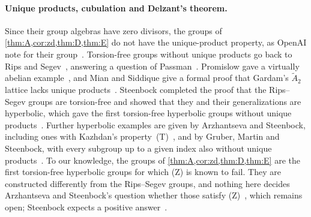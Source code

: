 \documentclass[11pt]{article}
\theoremstyle{definition}
\theoremstyle{plain}
\begin{document}
\paragraph{Unique products, cubulation and Delzant's theorem.} Since their group algebras have zero divisors, the groups of \cref{thm:A,cor:zd,thm:D,thm:E} do not have the unique-product property, as OpenAI note for their group~\cite[\S6]{OAI196}. Torsion-free groups without unique products go back to Rips and Segev~\cite{RipsSegev1987}, answering a question of Passman~\cite{Passman1977}. Promislow gave a virtually abelian example~\cite{Promislow1988}, and Mian and Siddique give a formal proof that Gardam's $\widetilde A_2$ lattice lacks unique products~\cite{MianSiddique2026}. Steenbock completed the proof that the Rips--Segev groups are torsion-free and showed that they and their generalizations are hyperbolic, which gave the first torsion-free hyperbolic groups without unique products~\cite{Steenbock2015}. Further hyperbolic examples are given by Arzhantseva and Steenbock, including ones with Kazhdan's property~(T)~\cite{ArzhantsevaSteenbock}, and by Gruber, Martin and Steenbock, with every subgroup up to a given index also without unique products~\cite{GruberMartinSteenbock2015}. To our knowledge, the groups of \cref{thm:A,cor:zd,thm:D,thm:E} are the first torsion-free hyperbolic groups for which (Z) is known to fail. They are constructed differently from the Rips--Segev groups, and nothing here decides Arzhantseva and Steenbock's question whether those satisfy (Z)~\cite[Open problem~6.1]{ArzhantsevaSteenbock}, which remains open; Steenbock expects a positive answer~\cite[Introduction]{Steenbock2015}.
\end{document}
